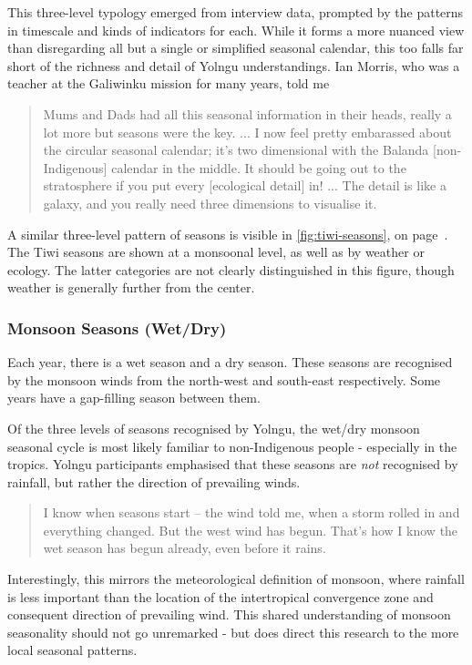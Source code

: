 This three-level typology emerged from interview data, prompted by
the patterns in timescale and kinds of indicators for each.
While it forms a more nuanced view than disregarding all but a single or
simplified seasonal calendar, this too falls far short of the richness
and detail of Yolngu understandings.
%
Ian Morris, who was a teacher at the Galiwinku mission for many years, told me
\begin{quote}
    Mums and Dads had all this seasonal information in their heads, really
    a lot more but seasons were the key. ...  I now feel pretty embarassed
    about the circular seasonal calendar; it's two dimensional with the Balanda
    [non-Indigenous] calendar in the middle.  It should be going out to the
    stratosphere if you put every [ecological detail] in! ... The detail is
    like a galaxy, and you really need three dimensions to visualise it.
\end{quote}

A similar three-level pattern of seasons is visible in \cref{fig:tiwi-seasons},
on page~\pageref{fig:tiwi-seasons}.  The Tiwi seasons are shown at a monsoonal level,
as well as by weather or ecology.  The latter categories are not clearly distinguished
in this figure, though weather is generally further from the center.


\subsubsection{Monsoon Seasons (Wet/Dry)}

Each year, there is a wet season and a dry season.  These seasons are
recognised by the monsoon winds from the north-west and south-east
respectively.  Some years have a gap-filling season between them.

Of the three levels of seasons recognised by Yolngu, the wet/dry monsoon
seasonal cycle is most likely familiar to non-Indigenous people - especially
in the tropics.  Yolngu participants emphasised that these seasons are
\emph{not} recognised by rainfall, but rather the direction of prevailing winds.
\begin{quote}
    I know when seasons start -- the wind told me, when a storm rolled in
    and everything changed.  But the west wind has begun.  That's how I
    know the wet season has begun already, even before it rains.
\end{quote}

Interestingly, this mirrors the meteorological definition of monsoon,
where rainfall is less important than the location of the intertropical
convergence zone and consequent direction of prevailing wind.
This shared understanding of monsoon seasonality should not go unremarked -
but does direct this research to the more local seasonal patterns.


